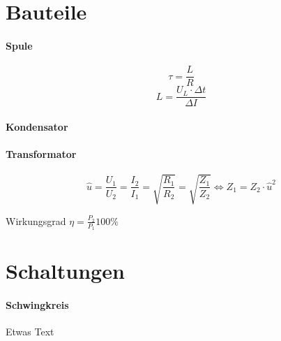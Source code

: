 \documentclass[10pt,landscape]{scrartcl}
\begin{document}
\begin{multicols}{3}
\section{Bauteile}

\paragraph{Spule}
$$ \tau = \frac{L}{R} $$
$$ L = \frac{U_L \cdot \Delta t}{\Delta I} $$

\noindent
{}

\paragraph{Kondensator}

\paragraph{Transformator}

$$ \widehat{u} = \frac{U_1}{U_2} = \frac{I_2}{I_1} = \sqrt{\frac{R_1}{R_2}} = \sqrt{\frac{Z_1}{Z_2}}  \Longleftrightarrow Z_1 = Z_2 \cdot \widehat{u}^2 $$

Wirkungsgrad $ \eta = \frac{P _2}{P_1} 100\% $

\section{Schaltungen}
\paragraph{Schwingkreis}

Etwas Text


\end{multicols}
\end{document}
